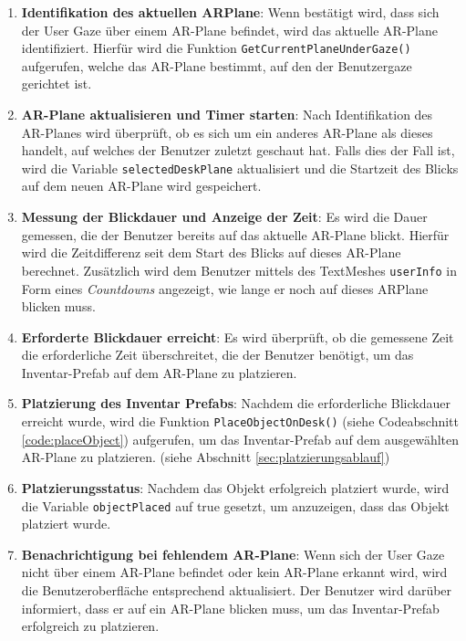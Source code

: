 \begin{itemize}
\begin{enumerate}
    \item \textbf{Identifikation des aktuellen ARPlane}: Wenn bestätigt wird, dass sich der User Gaze über einem AR-Plane
    befindet, wird das aktuelle AR-Plane identifiziert. Hierfür wird die Funktion \texttt{GetCurrentPlaneUnderGaze()} aufgerufen,
    welche das AR-Plane bestimmt, auf den der Benutzergaze gerichtet ist.

    \item \textbf{AR-Plane aktualisieren und Timer starten}: Nach Identifikation des AR-Planes wird überprüft, ob es sich um
    ein anderes AR-Plane als dieses handelt, auf welches der Benutzer zuletzt geschaut hat. Falls dies der Fall ist, wird
    die Variable \texttt{selectedDeskPlane} aktualisiert und die Startzeit des Blicks auf dem neuen AR-Plane wird gespeichert.

    \item \textbf{Messung der Blickdauer und Anzeige der Zeit}: Es wird die Dauer gemessen, die der Benutzer bereits auf das
    aktuelle AR-Plane blickt. Hierfür wird die Zeitdifferenz seit dem Start des Blicks auf dieses AR-Plane berechnet.
    Zusätzlich wird dem Benutzer mittels des TextMeshes \texttt{userInfo} in Form eines \textit{Countdowns} angezeigt, wie
    lange er noch auf dieses ARPlane blicken muss.

    \item \textbf{Erforderte Blickdauer erreicht}: Es wird überprüft, ob die gemessene Zeit die erforderliche Zeit
    überschreitet, die der Benutzer benötigt, um das Inventar-Prefab auf dem AR-Plane zu platzieren.

    \item \textbf{Platzierung des Inventar Prefabs}: Nachdem die erforderliche Blickdauer erreicht wurde, wird die Funktion
    \texttt{PlaceObjectOnDesk()} (siehe Codeabschnitt \ref{code:placeObject}) aufgerufen, um das Inventar-Prefab auf dem
    ausgewählten AR-Plane zu platzieren. (siehe Abschnitt \ref{sec:platzierungsablauf})

    \item \textbf{Platzierungsstatus}: Nachdem das Objekt erfolgreich platziert wurde, wird die Variable \texttt{objectPlaced}
    auf true gesetzt, um anzuzeigen, dass das Objekt platziert wurde.

    \item \textbf{Benachrichtigung bei fehlendem AR-Plane}: Wenn sich der User Gaze nicht über einem AR-Plane befindet oder
    kein AR-Plane erkannt wird, wird die Benutzeroberfläche entsprechend aktualisiert. Der Benutzer wird darüber informiert,
    dass er auf ein AR-Plane blicken muss, um das Inventar-Prefab erfolgreich zu platzieren.
\end{enumerate}


\end{itemize}
